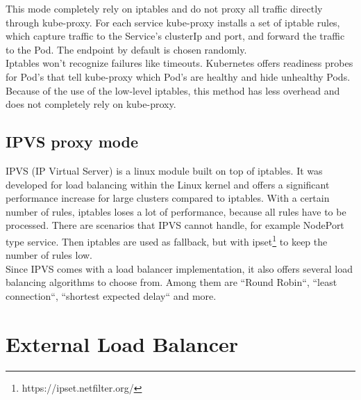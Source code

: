 This mode completely rely on iptables and do not proxy all traffic directly through kube-proxy.
For each service kube-proxy installs a set of iptable rules, which capture traffic to the Service's clusterIp and port, and forward the traffic to the Pod.
The endpoint by default is chosen randomly.
\\
Iptables won't recognize failures like timeouts.
Kubernetes offers readiness probes for Pod's that tell kube-proxy which Pod's are healthy and hide unhealthy Pods.
\\
Because of the use of the low-level iptables, this method has less overhead and does not completely rely on kube-proxy.~\cite{KUBERNETES-SERVICE}

\subsection{IPVS proxy mode}

IPVS (IP Virtual Server) is a linux module built on top of iptables.
It was developed for load balancing within the Linux kernel and offers a significant performance increase for large clusters compared to iptables.
With a certain number of rules, iptables loses a lot of performance, because all rules have to be processed.
There are scenarios that IPVS cannot handle, for example NodePort type service.
Then iptables are used as fallback, but with ipset\footnote{https://ipset.netfilter.org/} to keep the number of rules low.
\\
Since IPVS comes with a load balancer implementation, it also offers several load balancing algorithms to choose from.
Among them are ``Round Robin``, ``least connection``, ``shortest expected delay`` and more.~\cite{KUBERNETES-SERVICE}

\section{External Load Balancer}\label{sec:ExternalLoadBalancer}

